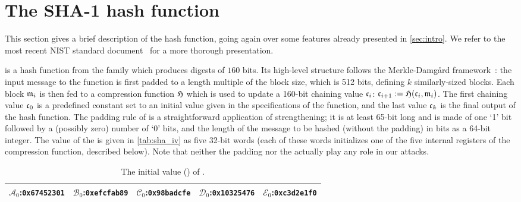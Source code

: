\section{The SHA-1 hash function}
\label{sec:description}

This section gives a brief description of the \shaone hash function, going again over some features already presented in \autoref{sec:intro}. We refer to the most recent NIST standard document~\cite{Nist-SHA} for a more thorough
presentation.

\shaone is a hash function from the \mdsha family which produces digests of $160$ bits.
Its high-level structure follows the Merkle-Damg{\aa}rd framework~\cite{DBLP:conf/crypto/Merkle89a,DBLP:conf/crypto/Damgard89a}: the input message to the function
is first padded to a length multiple of the block size, which is 512 bits, defining $k$ similarly-sized blocks.
Each block $\mathfrak{m}_i$ is then fed to a compression function $\operatorname{\mathfrak{H}}$ which is used to update a 160-bit chaining value $\mathfrak{c}_i$:
$\mathfrak{c}_{i+1} := \operatorname{\mathfrak{H}}(\mathfrak{c}_i,\mathfrak{m}_{i})$.
The first chaining value $\mathfrak{c}_0$ is a predefined constant set to an initial value \iv given in the specifications of the function, and the last value $\mathfrak{c}_k$ is the final output of the hash function.
The padding rule of \shaone is a straightforward application of \merkdam strengthening; it is at least 65-bit long and is made of one `1' bit followed by a (possibly zero)
number of `0' bits, and the length of the message to be hashed (without the padding) in bits as a 64-bit integer. The value of the \iv is given in \autoref{tab:sha_iv} as five 32-bit words
(each of these words initializes one of the five internal registers of the compression function, described below).
Note that neither the padding nor the \iv actually play any role in our attacks.

\begin{table}[ht]
\caption{\label{tab:sha_iv}The initial value (\iv) of \shaone.}
\begin{center}
\begin{tabular}{c c c c c} \toprule
$\mathcal{A}_0$:\texttt{0x67452301} & $\mathcal{B}_0$:\texttt{0xefcfab89} & $\mathcal{C}_0$:\texttt{0x98badcfe} & $\mathcal{D}_0$:\texttt{0x10325476} & $\mathcal{E}_0$:\texttt{0xc3d2e1f0} \\ 
\bottomrule
\end{tabular}
\end{center}
\end{table}

